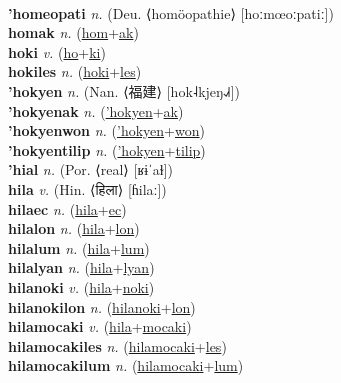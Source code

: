  \label{hom} \\
\textbf{'homeopati} \textit{n.} (Deu. ⟨homöopathie⟩ [hoːmœoːpatiː])
 \label{'homeopati} \\
\textbf{homak} \textit{n.} (\hyperref[hom]{hom}+\hyperref[ak]{ak})
 \label{homak} \\
\textbf{hoki} \textit{v.} (\hyperref[ho]{ho}+\hyperref[ki]{ki})
 \label{hoki} \\
\textbf{hokiles} \textit{n.} (\hyperref[hoki]{hoki}+\hyperref[les]{les})
 \label{hokiles} \\
\textbf{'hokyen} \textit{n.} (Nan. ⟨福建⟩ [hok˨kjeŋ˨˩˧])
 \label{'hokyen} \\
\textbf{'hokyenak} \textit{n.} (\hyperref['hokyen]{'hokyen}+\hyperref[ak]{ak})
 \label{'hokyenak} \\
\textbf{'hokyenwon} \textit{n.} (\hyperref['hokyen]{'hokyen}+\hyperref[won]{won})
 \label{'hokyenwon} \\
\textbf{'hokyentilip} \textit{n.} (\hyperref['hokyen]{'hokyen}+\hyperref[tilip]{tilip})
 \label{'hokyentilip} \\
\textbf{'hial} \textit{n.} (Por. ⟨real⟩ [ʁɨˈaɫ])
 \label{'hial} \\
\textbf{hila} \textit{v.} (Hin. ⟨हिला⟩ [ɦilaː])
 \label{hila} \\
\textbf{hilaec} \textit{n.} (\hyperref[hila]{hila}+\hyperref[ec]{ec})
 \label{hilaec} \\
\textbf{hilalon} \textit{n.} (\hyperref[hila]{hila}+\hyperref[lon]{lon})
 \label{hilalon} \\
\textbf{hilalum} \textit{n.} (\hyperref[hila]{hila}+\hyperref[lum]{lum})
 \label{hilalum} \\
\textbf{hilalyan} \textit{n.} (\hyperref[hila]{hila}+\hyperref[lyan]{lyan})
 \label{hilalyan} \\
\textbf{hilanoki} \textit{v.} (\hyperref[hila]{hila}+\hyperref[noki]{noki})
 \label{hilanoki} \\
\textbf{hilanokilon} \textit{n.} (\hyperref[hilanoki]{hilanoki}+\hyperref[lon]{lon})
 \label{hilanokilon} \\
\textbf{hilamocaki} \textit{v.} (\hyperref[hila]{hila}+\hyperref[mocaki]{mocaki})
 \label{hilamocaki} \\
\textbf{hilamocakiles} \textit{n.} (\hyperref[hilamocaki]{hilamocaki}+\hyperref[les]{les})
 \label{hilamocakiles} \\
\textbf{hilamocakilum} \textit{n.} (\hyperref[hilamocaki]{hilamocaki}+\hyperref[lum]{lum})
 \label{hilamocakilum} \\
